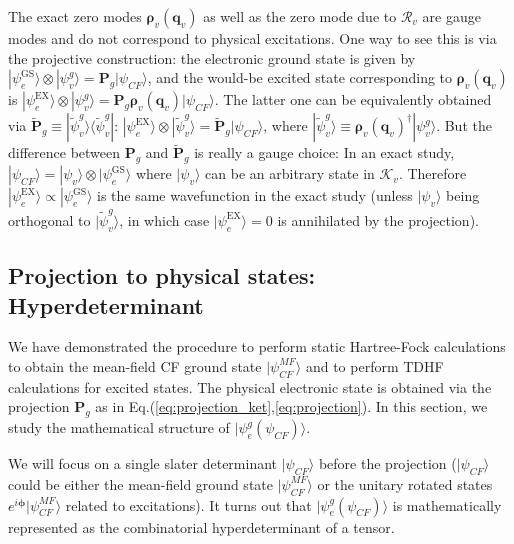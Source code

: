 The exact zero modes $\boldsymbol{\rho}_v(\mathbf q_v)$ as well as the zero mode due to $\mathcal R_v$ are gauge modes and do not correspond to physical excitations. One way to see this is via the projective construction: the electronic ground state is given by $|\psi^{\text{GS}}_e\rangle\otimes |\psi_v^g\rangle=\mathbf P_g|\psi_{CF}\rangle$, and the would-be excited state corresponding to $\boldsymbol{\rho}_v(\mathbf q_v)$ is $|\psi^{\text{EX}}_e\rangle\otimes |\psi_v^g\rangle=\mathbf P_g \boldsymbol{\rho}_v(\mathbf q_v)|\psi_{CF}\rangle$. The latter one can be equivalently obtained via $\mathbf{\tilde{ P}}_g\equiv |\tilde\psi_v^g\rangle\langle\tilde\psi_v^g|$: $|\psi^{\text{EX}}_e\rangle\otimes |\tilde\psi_v^g\rangle=\mathbf{\tilde{ P}}_g |\psi_{CF}\rangle$, where $|\tilde\psi^g_v\rangle\equiv \mathbf\rho_v(\mathbf q_v)^\dagger |\psi^g_v\rangle$. But the difference between $\mathbf P_g$ and $\mathbf{\tilde{ P}}_g$ is really a gauge choice: In an exact study, $|\psi_{CF}\rangle=|\psi_v\rangle\otimes|\psi_e^{\text{GS}}\rangle$ where $|\psi_v\rangle$ can be an arbitrary state in $\mathcal K_v$. Therefore $|\psi^{\text{EX}}_e\rangle\propto |\psi^{\text{GS}}_e\rangle$ is the same wavefunction in the exact study (unless $|\psi_v\rangle$ being orthogonal to $|\tilde\psi^g_v\rangle$, in which case $|\psi^{\text{EX}}_e\rangle=0$ is annihilated by the projection).

\subsection{Projection to physical states: Hyperdeterminant}\label{sec:proj}
We have demonstrated the procedure to perform static Hartree-Fock calculations to obtain the mean-field CF ground state $|\psi_{CF}^{MF}\rangle$ and to perform TDHF calculations for excited states. The physical electronic state is obtained via the projection $\mathbf P_g$ as in Eq.(\ref{eq:projection_ket},\ref{eq:projection}). In this section, we study the mathematical structure of $|\psi^g_e(\psi_{CF})\rangle$.

We will focus on a single slater determinant $|\psi_{CF}\rangle$ before the projection ($|\psi_{CF}\rangle$ could be either the mean-field ground state $|\psi_{CF}^{MF}\rangle$ or the unitary rotated states $e^{i\boldsymbol{\phi}}|\psi_{CF}^{MF}\rangle$ related to excitations). It turns out that $|\psi^g_e(\psi_{CF})\rangle$ is mathematically represented as the combinatorial hyperdeterminant of a tensor.

